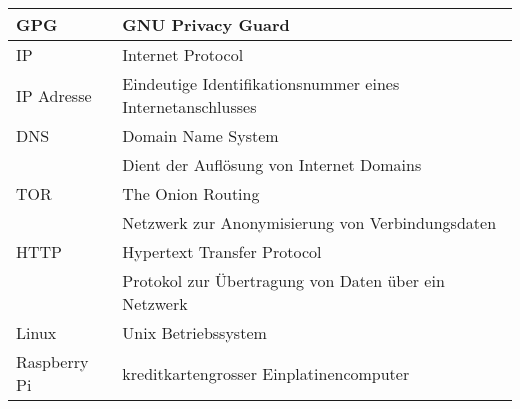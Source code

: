 \begin{tabular*}{\textwidth}{|p{}|p{}|}
  GPG & GNU Privacy Guard \\ \hline
  IP & Internet Protocol \\ \hline
  IP Adresse & Eindeutige Identifikationsnummer eines Internetanschlusses \\ \hline
  DNS & Domain Name System \\
      & Dient der Auflösung von Internet Domains \\ \hline
  TOR & The Onion Routing \\
      & Netzwerk zur Anonymisierung von Verbindungsdaten \\ \hline
  HTTP & Hypertext Transfer Protocol \\
       & Protokol zur Übertragung von Daten über ein Netzwerk \\ \hline
  Linux & Unix Betriebssystem \\ \hline
  Raspberry Pi & kreditkartengrosser Einplatinencomputer \\ \hline
\end{tabular*}
